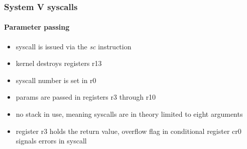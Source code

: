 \subsubsection{System V syscalls}

\paragraph{Parameter passing}

\begin{itemize}
\item syscall is issued via the {\em sc} instruction
\item kernel destroys registers r13
\item syscall number is set in r0
\item params are passed in registers r3 through r10
\item no stack in use, meaning syscalls are in theory limited to eight arguments
\item register r3 holds the return value, overflow flag in conditional register cr0 signals errors in syscall
\end{itemize}

